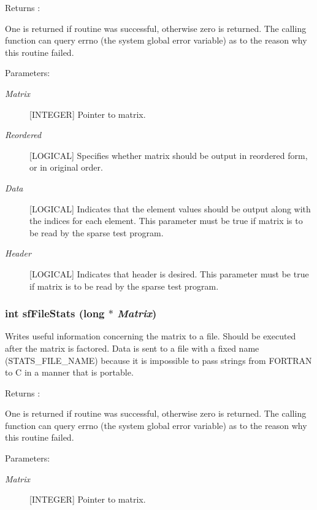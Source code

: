 \begin{Desc}
\item[Returns :]\par
 One is returned if routine was successful, otherwise zero is returned. The calling function can query errno (the system global error variable) as to the reason why this routine failed.\end{Desc}
\begin{Desc}
\item[Parameters: ]\par
\begin{description}
\item[{\em 
Matrix}][INTEGER] Pointer to matrix. \item[{\em 
Reordered}][LOGICAL] Specifies whether matrix should be output in reordered form, or in original order. \item[{\em 
Data}][LOGICAL] Indicates that the element values should be output along with the indices for each element. This parameter must be true if matrix is to be read by the sparse test program. \item[{\em 
Header}][LOGICAL] Indicates that header is desired. This parameter must be true if matrix is to be read by the sparse test program. \end{description}
\end{Desc}
\subsubsection{\setlength{\rightskip}{0pt plus 5cm}int sf\-File\-Stats (long $\ast$ {\em Matrix})}\label{spFortran_8c_a69}


Writes useful information concerning the matrix to a file. Should be executed after the matrix is factored. Data is sent to a file with a fixed name (STATS\_\-FILE\_\-NAME) because it is impossible to pass strings from FORTRAN to C in a manner that is portable.

\begin{Desc}
\item[Returns :]\par
[LOGICAL] One is returned if routine was successful, otherwise zero is returned. The calling function can query errno (the system global error variable) as to the reason why this routine failed.\end{Desc}
\begin{Desc}
\item[Parameters: ]\par
\begin{description}
\item[{\em 
Matrix}][INTEGER] Pointer to matrix. \end{description}
\end{Desc}
